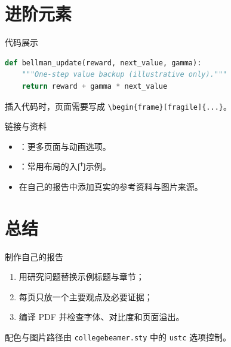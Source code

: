 \documentclass[aspectratio=169]{beamer}
\begin{document}
\section{进阶元素}

\begin{frame}[fragile]{代码展示}
  \begin{lstlisting}[language=Python]
def bellman_update(reward, next_value, gamma):
    """One-step value backup (illustrative only)."""
    return reward + gamma * next_value
  \end{lstlisting}
  \vspace{0.3cm}
  插入代码时，页面需要写成 \verb|\begin{frame}[fragile]{...}|。
\end{frame}

\begin{frame}{链接与资料}
  \begin{itemize}
    \item {}：更多页面与动画选项。
    \item {}：常用布局的入门示例。
    \item 在自己的报告中添加真实的参考资料与图片来源。
  \end{itemize}
\end{frame}

\section{总结}

\begin{frame}{制作自己的报告}
  \begin{enumerate}
    \item 用研究问题替换示例标题与章节；
    \item 每页只放一个主要观点及必要证据；
    \item 编译 PDF 并检查字体、对比度和页面溢出。
  \end{enumerate}
  \vspace{0.5cm}
  配色与图片路径由 \texttt{collegebeamer.sty} 中的 \texttt{ustc} 选项控制。
\end{frame}

\QApage
\end{document}
